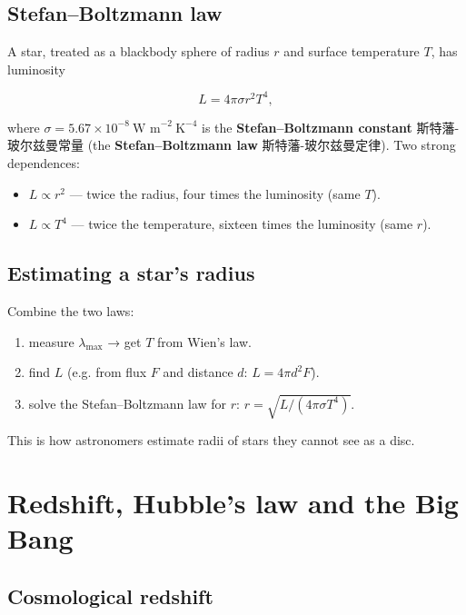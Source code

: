 \documentclass[11pt]{article}
\begin{document}
\subsection*{Stefan–Boltzmann law}

A star, treated as a blackbody sphere of radius $r$ and surface temperature $T$, has luminosity

\[
L = 4\pi \sigma r^{2} T^{4},
\]

where $\sigma = 5.67 \times 10^{-8}\ \text{W m}^{-2}\ \text{K}^{-4}$ is the \textbf{Stefan–Boltzmann constant} 斯特藩-玻尔兹曼常量 (the \textbf{Stefan–Boltzmann law} 斯特藩-玻尔兹曼定律). Two strong dependences:

\begin{itemize}
\item $L \propto r^{2}$ — twice the radius, four times the luminosity (same $T$).

\item $L \propto T^{4}$ — twice the temperature, sixteen times the luminosity (same $r$).

\end{itemize}

\subsection*{Estimating a star's radius}

Combine the two laws:

\begin{enumerate}
\item measure $\lambda_{\text{max}}$ → get $T$ from Wien's law.

\item find $L$ (e.g. from flux $F$ and distance $d$: $L = 4\pi d^{2} F$).

\item solve the Stefan–Boltzmann law for $r$: $r = \sqrt{L/(4\pi \sigma T^{4})}$.

\end{enumerate}

This is how astronomers estimate radii of stars they cannot see as a disc.

\section*{Redshift, Hubble's law and the Big Bang}

\subsection*{Cosmological redshift}
\end{document}
